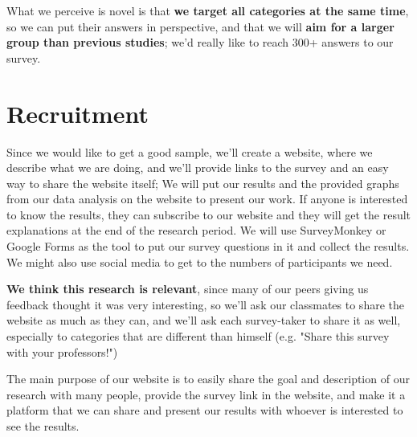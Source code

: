 \documentclass{sigchi}
\begin{document}
 What we perceive is novel is that \textbf{we target all categories at the same time}, so we can put their answers in perspective, and that we will \textbf{aim for a larger group than previous studies}; we'd really like to reach 300+ answers to our survey.
 
\section{Recruitment}
Since we would like to get a good sample, we'll create a website, where we describe what we are doing, and we'll provide links to the survey and an easy way to share the website itself; We will put our results and the provided graphs from our data analysis on the website to present our work. If anyone is interested to know the results, they can subscribe to our website and they will get the result explanations at the end of the research period. We will use SurveyMonkey or Google Forms as the tool to put our survey questions in it and collect the results. We might also use social media to get to the numbers of participants we need. 

 \textbf{We think this research is relevant}, since many of our peers giving us feedback thought it was very interesting, so we'll ask our classmates to share the website as much as they can, and we'll ask each survey-taker to share it as well, especially to categories that are different than himself (e.g. "Share this survey with your professors!")
 
 The main purpose of our website is to easily share the goal and description of our research with many people, provide the survey link in the website, and make it a platform that we can share and present our results with whoever is interested to see the results.
 
\end{document}
